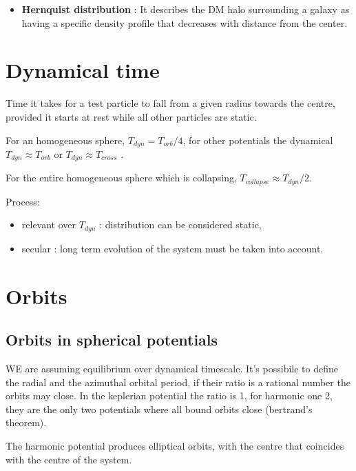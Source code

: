 \documentclass[a4paper,12pt]{article}
\begin{document}
\begin{itemize}
 
 
	\item \textbf{Hernquist distribution} : It describes the DM halo surrounding a galaxy as having a specific density profile that decreases with distance from the center.
	
\end{itemize}




\section{Dynamical time}

Time it takes for a test particle to fall from a given radius towards the centre, provided it starts at rest while all other particles are static.

For an homogeneous sphere, $T_{dyn} = T_{orb}/4$, for other potentials the dynamical $T_{dyn} \approx T_{orb} $ or $T_{dyn} \approx T_{cross} $ .

For the entire homogeneous sphere which is collapsing, $T_{collapse} \approx T_{dyn}/2 $.

Process:

\begin{itemize}
	\item relevant over $T_{dyn}$ : distribution can be considered static,
	\item secular : long term evolution of the system must be taken into account.
\end{itemize}



\section{Orbits}

\subsection{Orbits in spherical potentials}
WE are assuming equilibrium over dynamical timescale. It's possibile to define the radial and the azimuthal orbital period, if their ratio is a rational number the orbits may close. In the keplerian potential the ratio is 1, for harmonic one 2, they are the only two potentials where all bound orbits close (bertrand's theorem).

The harmonic potential produces elliptical orbits, with the centre that coincides with the centre of the system.
\end{document}
